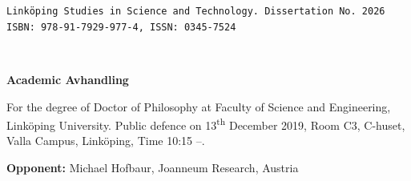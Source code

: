%



 
\begin{titlepage}

 \begin{center}

\texttt{Link\"{o}ping Studies in Science and Technology. Dissertation No.~2026 \newline
 ISBN: 978-91-7929-977-4, ISSN: 0345-7524
 }
 
 \bigskip 

\begingroup
\Large{\texttt{\myTitle}} \\ \bigskip %
 {\texttt{\myName}} %
\endgroup

\bigskip

\Large{\textbf{Academic Avhandling}}
\end{center}

\noindent For the degree of Doctor of Philosophy at Faculty of Science and Engineering, Link\"{o}ping University.
Public defence on 13\textsuperscript{th} December 2019, Room C3, C-huset, Valla Campus, Linköping, Time 10:15 --.
 
\bigskip
\noindent \textbf{Opponent:} Michael Hofbaur, Joanneum Research, Austria
 
 

 \hfill\vfill

\begin{flushbottom}
 
 
 
 

\end{flushbottom}
\end{titlepage}
